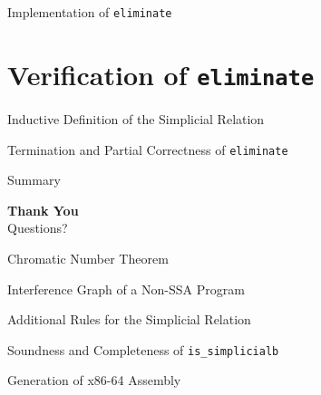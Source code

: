 \documentclass[aspectratio=169,xcolor=dvipsnames]{beamer}
\begin{document}
\begin{frame}{Implementation of \texttt{eliminate}}

\end{frame}

\section{Verification of \texttt{eliminate}}

\begin{frame}{Inductive Definition of the Simplicial Relation}

\end{frame}

\begin{frame}{Termination and Partial Correctness of \texttt{eliminate}}

\end{frame}

\begin{frame}{Summary}

\end{frame}

\begin{frame}
    \centering
    {\Huge \textbf{Thank You}} \\[1.5em]
    {\LARGE Questions?}
\end{frame}

\appendix
\backupbegin

\begin{frame}{Chromatic Number Theorem}

\end{frame}

\begin{frame}{Interference Graph of a Non-SSA Program}

\end{frame}

\begin{frame}{Additional Rules for the Simplicial Relation}

\end{frame}

\begin{frame}{Soundness and Completeness of \texttt{is\_simplicialb}}

\end{frame}

\begin{frame}{Generation of x86-64 Assembly}

\end{frame}
\backupend
\end{document}

